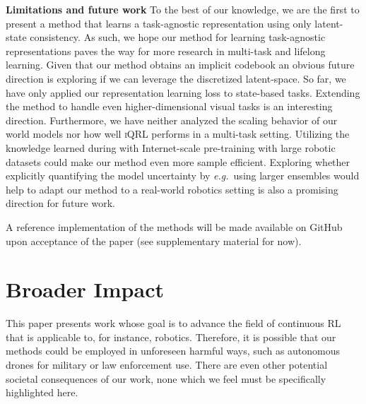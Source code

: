 \documentclass{article}
\makeatletter
\theoremstyle{plain}
\theoremstyle{definition}
\theoremstyle{remark}
\newcommand{\our}{\textsc{iQRL}\xspace}
\newcommand{\eg}{\textit{e.g.\@}\xspace}
\makeatother
\begin{document}
\textbf{Limitations and future work}
To the best of our knowledge, we are the first to present a method that learns a task-agnostic representation
using only latent-state consistency. As such, we hope our method for learning task-agnostic representations paves the
way for more research in multi-task and lifelong learning.
Given that our method obtains an implicit codebook an obvious future direction is exploring if we can leverage the
discretized latent-space. So far, we have only applied our representation learning loss to state-based tasks. Extending the method to handle even higher-dimensional visual tasks is an interesting direction. Furthermore, we have neither analyzed the scaling behavior of our world models nor how well \our performs in a multi-task setting. Utilizing the knowledge learned during with Internet-scale pre-training with large robotic datasets could make our method even more sample efficient. Exploring whether explicitly quantifying the model uncertainty by \eg\ using larger ensembles would help to adapt our method to a real-world robotics setting is also a promising direction for future work.


A reference implementation of the methods will be made available on GitHub upon acceptance of the paper (see supplementary material for now).



\section*{Broader Impact}
This paper presents work whose goal is to advance the field of continuous RL that is applicable to, for instance, robotics. Therefore, it is possible that our methods could be employed in unforeseen harmful ways, such as autonomous drones for military or law enforcement use. There are even other potential societal consequences of our work, none which we feel must be specifically highlighted here.






\newpage
\appendix
\onecolumn
\end{document}
